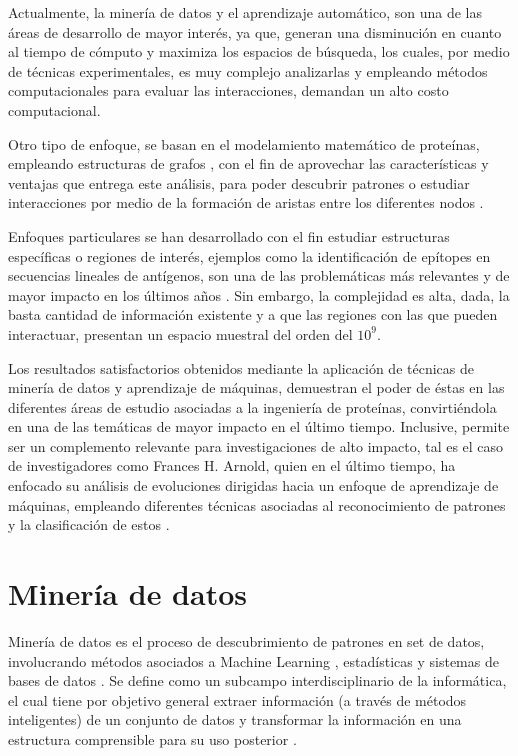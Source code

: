 Actualmente, la minería de datos y el aprendizaje automático, son una de las áreas de desarrollo de mayor interés, ya que, generan una disminución en cuanto al tiempo de cómputo y maximiza los espacios de búsqueda, los cuales, por medio de técnicas experimentales, es muy complejo analizarlas y empleando métodos computacionales para evaluar las interacciones, demandan un alto costo computacional.

Otro tipo de enfoque, se basan en el modelamiento matemático de proteínas, empleando estructuras de grafos \cite{canutescu2003graph, vishveshwara2002protein}, con el fin de aprovechar las características y ventajas que entrega este análisis, para poder descubrir patrones o estudiar interacciones por medio de la formación de aristas entre los diferentes nodos \cite{martin2017loto}.

Enfoques particulares se han desarrollado con el fin estudiar estructuras específicas o regiones de interés, ejemplos como la identificación de epítopes en secuencias lineales de antígenos, son una de las problemáticas más relevantes y de mayor impacto en los últimos años \cite{jespersen2017bepipred, odorico2003bepitope, saha2008abcpred}. Sin embargo, la complejidad es alta, dada, la basta cantidad de información existente y a que las regiones con las que pueden interactuar, presentan un espacio muestral del orden del $10^9$.

Los resultados satisfactorios obtenidos mediante la aplicación de técnicas de minería de datos y aprendizaje de máquinas, demuestran el poder de éstas en las diferentes áreas de estudio asociadas a la ingeniería de proteínas, convirtiéndola en una de las temáticas de mayor impacto en el último tiempo. Inclusive, permite ser un complemento relevante para investigaciones de alto impacto, tal es el caso de investigadores como Frances H. Arnold, quien en el último tiempo, ha enfocado su análisis de evoluciones dirigidas hacia un enfoque de aprendizaje de máquinas, empleando diferentes técnicas asociadas al reconocimiento de patrones y la clasificación de estos \cite{bedbrook2019machine, wu2019machine, yang2018machine}.

\section{Minería de datos}


Minería de datos es el proceso de descubrimiento de patrones en set de datos, involucrando métodos asociados a Machine Learning \cite{michie1994machine}, estadísticas y sistemas de bases de datos \cite{hand2006data}. Se define como un subcampo interdisciplinario de la informática, el cual tiene por objetivo general extraer información (a través de métodos inteligentes) de un conjunto de datos y transformar la información en una estructura comprensible para su uso posterior \cite{fayyad1996knowledge, dunham2006data}. 


